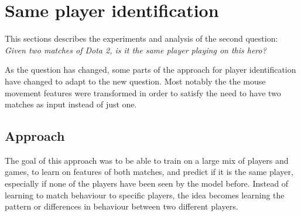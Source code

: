 \documentclass[Report.tex]{subfiles}
\begin{document}
\section{Same player identification}\label{sec:pair-classification}
This sections describes the experiments and analysis of the second question: \textit{Given two matches of Dota 2, is it the same player playing on this hero?}

As the question has changed, some parts of the approach for player identification have changed to adapt to the new question. Most notably the the mouse movement features were transformed in order to satisfy the need to have two matches as input instead of just one. 

\subsection{Approach}

The goal of this approach was to be able to train on a large mix of players and games, to learn on features of both matches, and predict if it is the same player, especially if none of the players have been seen by the model before. Instead of learning to match behaviour to specific players, the idea becomes learning the pattern or differences in behaviour between two different players. 
\end{document}
